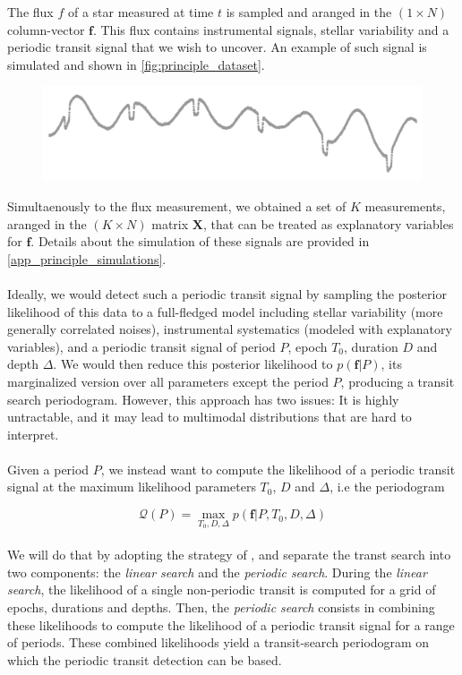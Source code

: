 \documentclass{aastex631}
\begin{document}
The flux $f$ of a star measured at time $t$ is sampled and aranged in the $(1\times N)$ column-vector $\bm{f}$. This flux contains instrumental signals, stellar variability and a periodic transit signal that we wish to uncover. An example of such signal is simulated and shown in \autoref{fig:principle_dataset}.

\begin{figure}[H]
    \begin{centering}
        \includegraphics[width=0.7\linewidth]{../figures/principle_dataset.pdf}
        \caption{}
        \label{fig:principle_dataset}
    \end{centering}
\end{figure}

Simultaenously to the flux measurement, we obtained a set of $K$ measurements, aranged in the $(K\times N)$ matrix $\bm{X}$, that can be treated as explanatory variables for $\bm{f}$. Details about the simulation of these signals are provided in \autoref{app_principle_simulations}.
\\\\
Ideally, we would detect such  a periodic transit signal by sampling the posterior likelihood of this data to a full-fledged model including stellar variability (more generally correlated noises), instrumental systematics (modeled with explanatory variables), and a periodic transit signal of period $P$, epoch $T_0$, duration $D$ and depth $\Delta$. We would then reduce this posterior likelihood to $p(\bm{f}\vert P)$, its marginalized version over all parameters except the period $P$, producing a transit search periodogram. However, this approach has two issues: It is highly untractable, and it may lead to multimodal distributions that are hard to interpret.
\\\\
Given a period $P$, we instead want to compute the likelihood of a periodic transit signal at the maximum likelihood parameters $T_0$, $D$ and $\Delta$, i.e the periodogram

$$\mathcal{Q}(P) = \max_{T_0, D, \Delta}p(\bm{f} \vert P, T_0 ,D, \Delta)$$
\\
We will do that by adopting the strategy of \cite{foreman2016}, and separate the transt search into two components: the \textit{linear search} and the \textit{periodic search}. During the \textit{linear search}, the likelihood of a single non-periodic transit is computed for a grid of epochs, durations and depths. Then, the \textit{periodic search} consists in combining these likelihoods to compute the likelihood of a periodic transit signal for a range of periods. These combined likelihoods yield a transit-search periodogram on which the periodic transit detection can be based.
\end{document}
